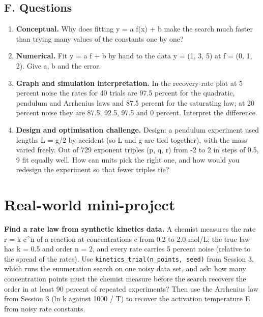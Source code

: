 \documentclass[11pt,a4paper]{article}
\begin{document}
\subsection*{F. Questions}
\begin{enumerate}[nosep]
\item \textbf{Conceptual.} Why does fitting y = a f(x) + b make the search much faster than trying many values of the constants one by one?
\item \textbf{Numerical.} Fit y = a f + b by hand to the data y = (1, 3, 5) at f = (0, 1, 2). Give a, b and the error.
\item \textbf{Graph and simulation interpretation.} In the recovery-rate plot at 5 percent noise the rates for 40 trials are 97.5 percent for the quadratic, pendulum and Arrhenius laws and 87.5 percent for the saturating law; at 20 percent noise they are 87.5, 92.5, 97.5 and 0 percent. Interpret the difference.
\item \textbf{Design and optimisation challenge.} Design: a pendulum experiment used lengths L = g/2 by accident (so L and g are tied together), with the mass varied freely. Out of 729 exponent triples (p, q, r) from -2 to 2 in steps of 0.5, 9 fit equally well. How can units pick the right one, and how would you redesign the experiment so that fewer triples tie?
\end{enumerate}

\section{Real-world mini-project}
\textbf{Find a rate law from synthetic kinetics data.} A chemist measures the rate r = k c\textasciicircum{}n of a reaction at concentrations c from 0.2 to 2.0 mol/L; the true law has k = 0.5 and order n = 2, and every rate carries 5 percent noise (relative to the spread of the rates). Use \texttt{kinetics\_trial(n\_points, seed)} from Session 3, which runs the enumeration search on one noisy data set, and ask: how many concentration points must the chemist measure before the search recovers the order in at least 90 percent of repeated experiments? Then use the Arrhenius law from Session 3 (ln k against 1000 / T) to recover the activation temperature E from noisy rate constants.
\end{document}
